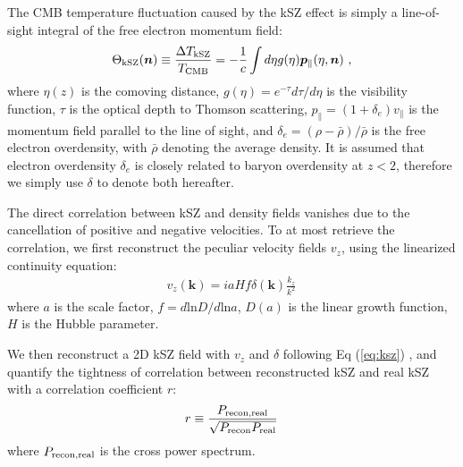 \label{sec:kszRecon}
The CMB temperature fluctuation caused by the kSZ effect is simply a line-of-sight integral of the free electron momentum field:
\begin{eqnarray}
\label{eq:ksz}
\Theta_\mathrm{kSZ}(\bm{n})\equiv\frac{\Delta T_\mathrm{kSZ}}{T_{\mathrm{CMB}}}
=-\frac{1}{c}\int d\eta  g(\eta)  \bm{p}_\parallel(\eta,\bm{n})\ ,
\end{eqnarray}
where $\eta(z)$ is the comoving distance, $g(\eta)=e^{-\tau} d\tau/d\eta$ is the visibility function, $\tau$ is the optical depth to Thomson scattering, 
$p_\parallel=(1+\delta_e)v_\parallel$ is the momentum field parallel to the line of sight, and $\delta_e=(\rho-\bar{\rho})/\bar{\rho}$ is the free electron overdensity, with $\bar\rho$ denoting the average density. It is assumed that electron overdensity $\delta_e$ is closely related to baryon overdensity at $z<2$, therefore we simply use $\delta$ to denote both hereafter.

The direct correlation between kSZ and density fields vanishes due to the cancellation of positive and negative velocities. To at most retrieve the correlation,  we first reconstruct the peculiar velocity fields $v_z$, using the linearized continuity equation:
\begin{eqnarray}
	\label{eq:v}
v_z(\bm{k})=i a H f\delta(\bm{k})\frac{k_z}{k^2}\,
\end{eqnarray}
where $a$ is the scale factor, $f=d\mathrm{ln}D/d\mathrm{ln}a$, $D(a)$ is the linear growth function, $H$ is the Hubble parameter. 

We then reconstruct a 2D kSZ field with $v_z$ and $\delta$ following Eq (\ref{eq:ksz}) , 
and quantify the tightness of correlation between reconstructed kSZ and real kSZ 
with a correlation coefficient $r$:
\begin{eqnarray}
\label{eq:r}
	r\equiv \frac{P_\mathrm{recon,real}}{\sqrt{P_\mathrm{recon}P_\mathrm{real}}}\,
\end{eqnarray}
where $P_\mathrm{recon,real}$ is the cross power spectrum.

